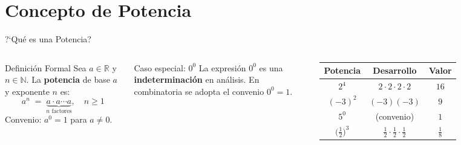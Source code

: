 \documentclass[12pt,aspectratio=169]{beamer}
\begin{document}
\section{Concepto de Potencia}

\begin{frame}{?`Qu\'{e} es una Potencia?}
  \begin{columns}[T]
    \begin{cdef}{Definici\'on Formal}
      Sea $a\in\mathbb{R}$ y $n\in\mathbb{N}$. La \textbf{potencia} de base $a$
      y exponente $n$ es:
      \[
        a^n \;=\; \underbrace{a\cdot a\cdots a}_{n\text{ factores}},\quad n\ge 1
      \]
      Convenio: $a^{0}=1$ para $a\neq 0$.
    \end{cdef}
    \vspace{5pt}
    \begin{calert}{Caso especial: $0^0$}
      La expresi\'on $0^0$ es una \textbf{indeterminaci\'on} en an\'alisis.
      En combinatoria se adopta el convenio $0^0=1$.
    \end{calert}

    \vspace{6pt}

    \renewcommand{\arraystretch}{1.35}
    \begin{tabular}{ccc}
      \toprule
      Potencia & Desarrollo & Valor\\
      \midrule
      $2^{4}$ & $2{\cdot}2{\cdot}2{\cdot}2$ & $16$\\
      $(-3)^{2}$ & $(-3)(-3)$ & $9$\\
      $5^{0}$ & (convenio) & $1$\\
      $\bigl(\tfrac{1}{2}\bigr)^{3}$ & $\tfrac{1}{2}{\cdot}\tfrac{1}{2}{\cdot}\tfrac{1}{2}$ & $\tfrac{1}{8}$\\
      \bottomrule
    \end{tabular}
  \end{columns}
\end{frame}
\end{document}
